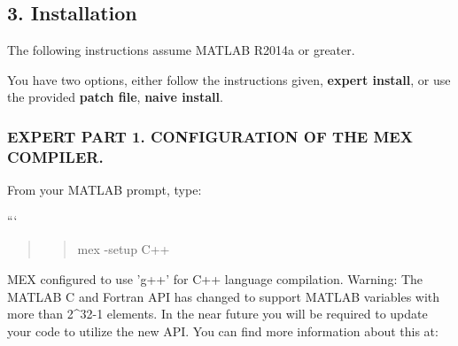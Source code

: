 \begin{DoxyPre}\subsection*{3. Installation}\end{DoxyPre}



\begin{DoxyPre}\end{DoxyPre}



\begin{DoxyPre}The following instructions assume MATLAB R2014a or greater.\end{DoxyPre}



\begin{DoxyPre}You have two options, either follow the instructions given, {\bfseries expert install},
or use the provided {\bfseries patch file}, {\bfseries naive install}.\end{DoxyPre}



\begin{DoxyPre}\subsubsection*{EXPERT PART 1. CONFIGURATION OF THE MEX COMPILER.}\end{DoxyPre}



\begin{DoxyPre}\end{DoxyPre}



\begin{DoxyPre}From your MATLAB prompt, type:\end{DoxyPre}



\begin{DoxyPre}```
\begin{quotation}
\begin{quotation}
mex -setup C++

\end{quotation}


\end{quotation}
MEX configured to use 'g++' for C++ language compilation.
Warning: The MATLAB C and Fortran API has changed to support MATLAB
     variables with more than 2^32-1 elements. In the near future
     you will be required to update your code to utilize the
     new API. You can find more information about this at:\end{DoxyPre}



